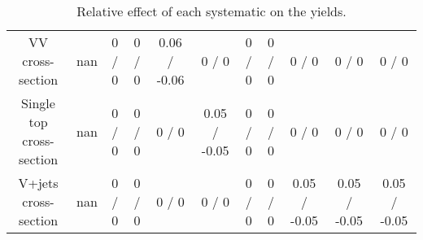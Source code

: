 \begin{table}[htbp]
\begin{center}
\begin{tabular}{|c|c|c|c|c|c|c|c|c|c|c|}
  VV cross-section &    nan    & 0 / 0 & 0 / 0 & 0.06 / -0.06 & 0 / 0 & 0 / 0 & 0 / 0 & 0 / 0 & 0 / 0 & 0 / 0 \\ 
  Single top cross-section &    nan    & 0 / 0 & 0 / 0 & 0 / 0 & 0.05 / -0.05 & 0 / 0 & 0 / 0 & 0 / 0 & 0 / 0 & 0 / 0 \\ 
  V+jets cross-section &    nan    & 0 / 0 & 0 / 0 & 0 / 0 & 0 / 0 & 0 / 0 & 0 / 0 & 0.05 / -0.05 & 0.05 / -0.05 & 0.05 / -0.05 \\ 
\hline 
\end{tabular} 
\caption{Relative effect of each systematic on the yields.} 
\end{center} 
\end{table} 
